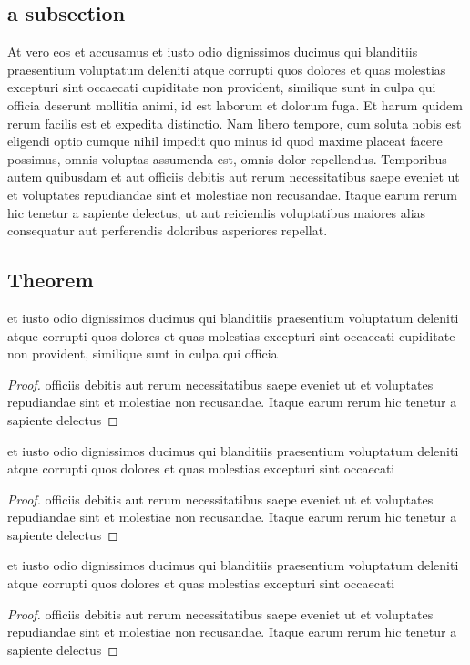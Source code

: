 \documentclass[12pt, twoside]{report}
\begin{document}
\subsection{a subsection}
At vero eos et accusamus \cite{cite_ex} et iusto odio dignissimos ducimus qui blanditiis praesentium voluptatum deleniti atque corrupti quos dolores et quas molestias excepturi sint occaecati 
cupiditate non provident, similique sunt in culpa qui officia deserunt mollitia animi, id est laborum et dolorum fuga. Et harum quidem rerum facilis est et expedita distinctio. 
Nam libero tempore, cum soluta nobis est eligendi optio cumque nihil impedit quo minus id quod maxime placeat facere possimus, omnis voluptas assumenda est, omnis dolor repellendus. 
Temporibus autem quibusdam et aut officiis debitis aut rerum necessitatibus saepe eveniet ut et voluptates repudiandae sint et molestiae non recusandae. 
Itaque earum rerum hic tenetur a sapiente delectus, ut aut reiciendis voluptatibus maiores alias consequatur aut perferendis doloribus asperiores repellat.
\subsection{Theorem}

\begin{theorem}
et iusto odio dignissimos ducimus qui blanditiis praesentium voluptatum deleniti atque corrupti quos dolores et quas molestias excepturi sint occaecati 
cupiditate non provident, similique sunt in culpa qui officia
\end{theorem}
\begin{proof}
    officiis debitis aut rerum necessitatibus saepe eveniet ut et voluptates repudiandae sint et molestiae non recusandae. 
Itaque earum rerum hic tenetur a sapiente delectus
\end{proof}

\begin{definition}
    et iusto odio dignissimos ducimus qui blanditiis praesentium voluptatum deleniti atque corrupti quos dolores et quas molestias excepturi sint occaecati 
\end{definition}
\begin{proof}
    officiis debitis aut rerum necessitatibus saepe eveniet ut et voluptates repudiandae sint et molestiae non recusandae. 
Itaque earum rerum hic tenetur a sapiente delectus
\end{proof}

\begin{lemma}
    et iusto odio dignissimos ducimus qui blanditiis praesentium voluptatum deleniti atque corrupti quos dolores et quas molestias excepturi sint occaecati 
\end{lemma}
\begin{proof}
    officiis debitis aut rerum necessitatibus saepe eveniet ut et voluptates repudiandae sint et molestiae non recusandae. 
Itaque earum rerum hic tenetur a sapiente delectus
\end{proof}
\end{document}
